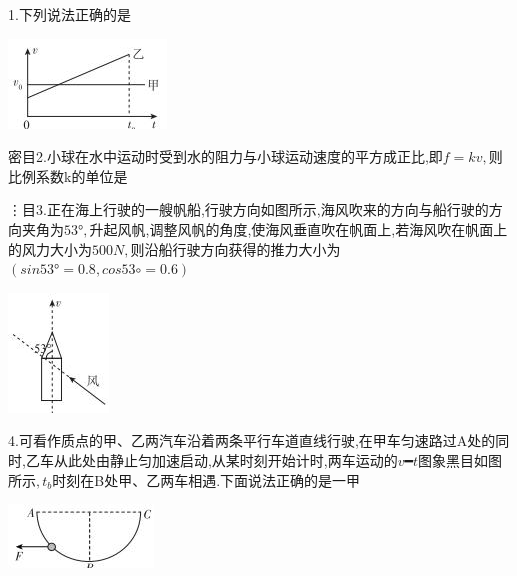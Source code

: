 \question[6]1.下列说法正确的是
\begin{center}
\includegraphics[]{img/image1.jpeg}
\end{center}

\begin{solution}{4cm}

\end{solution}



\question[6]密目2.小球在水中运动时受到水的阻力与小球运动速度的平方成正比,即$f=kv,$则比例系数k的单位是
\begin{solution}{4cm}

\end{solution}



\question[6]⋮目3.正在海上行驶的一艘帆船,行驶方向如图所示,海风吹来的方向与船行驶的方向夹角为$53°,$升起风帆,调整风帆的角度,使海风垂直吹在帆面上,若海风吹在帆面上的风力大小为$500N,$则沿船行驶方向获得的推力大小为$(sin53°=0.8,cos53∘=0.6)$
\begin{center}
\includegraphics[]{img/image3.jpeg}
\end{center}

\begin{solution}{4cm}

\end{solution}



\question[6]4.可看作质点的甲、乙两汽车沿着两条平行车道直线行驶,在甲车匀速路过A处的同时,乙车从此处由静止匀加速启动,从某时刻开始计时,两车运动的$v━t$图象黑目如图所示$,t_b$时刻在B处甲、乙两车相遇.下面说法正确的是一甲
\begin{center}
\includegraphics[]{img/image4.jpeg}
\end{center}


